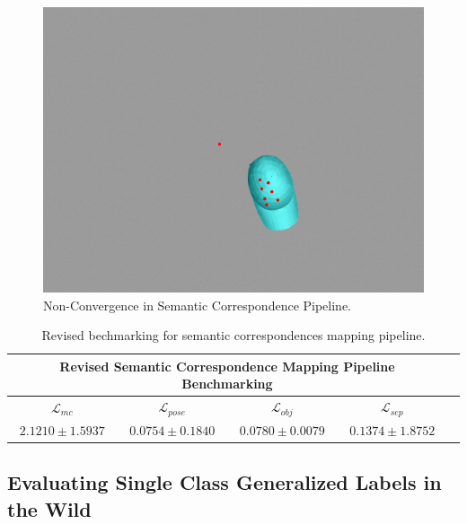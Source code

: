 \begin{figure}[htb]
    \centering
    \caption{Non-Convergence in Semantic Correspondence Pipeline.}
    \label{fig:non_convergence}
    \includegraphics[scale=0.2]{images/cap/defect_a.png}
\end{figure}

\begin{table}[htb]
    \centering
    \begin{tabular}{lcccc}
        \hline
        \multicolumn{4}{c}{Revised Semantic Correspondence Mapping Pipeline Benchmarking}                                                                                      \\ \hline
        \multicolumn{1}{c}{$\mathcal{L}_{mc}$}  & \multicolumn{1}{c}{$\mathcal{L}_{pose}$} & \multicolumn{1}{c}{$\mathcal{L}_{obj}$} & \multicolumn{1}{c}{$\mathcal{L}_{sep}$} \\ \hline
        \multicolumn{1}{c}{$2.1210 \pm 1.5937$} & \multicolumn{1}{c}{$0.0754 \pm 0.1840$}  & \multicolumn{1}{c}{$0.0780 \pm 0.0079$} & \multicolumn{1}{c}{$0.1374 \pm 1.8752$} \\ \hline
    \end{tabular}
    \caption{Revised bechmarking for semantic correspondences mapping pipeline.}
    \label{table:revised_benchmark_semantic_correspondence}
\end{table}


\subsection{Evaluating Single Class Generalized Labels in the Wild}

